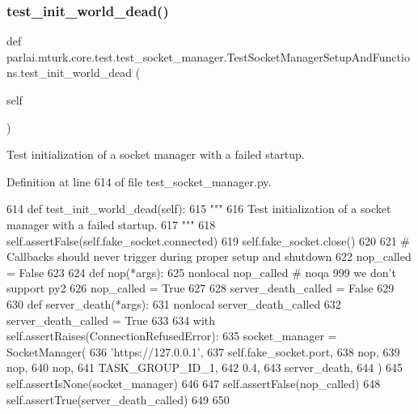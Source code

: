 \subsubsection{\texorpdfstring{test\+\_\+init\+\_\+world\+\_\+dead()}{test\_init\_world\_dead()}}
{\footnotesize\ttfamily def parlai.\+mturk.\+core.\+test.\+test\+\_\+socket\+\_\+manager.\+Test\+Socket\+Manager\+Setup\+And\+Functions.\+test\+\_\+init\+\_\+world\+\_\+dead (\begin{DoxyParamCaption}\item[{}]{self }\end{DoxyParamCaption})}

\begin{DoxyVerb}Test initialization of a socket manager with a failed startup.
\end{DoxyVerb}
 

Definition at line 614 of file test\+\_\+socket\+\_\+manager.\+py.


\begin{DoxyCode}
614     \textcolor{keyword}{def }test\_init\_world\_dead(self):
615         \textcolor{stringliteral}{"""}
616 \textcolor{stringliteral}{        Test initialization of a socket manager with a failed startup.}
617 \textcolor{stringliteral}{        """}
618         self.assertFalse(self.fake\_socket.connected)
619         self.fake\_socket.close()
620 
621         \textcolor{comment}{# Callbacks should never trigger during proper setup and shutdown}
622         nop\_called = \textcolor{keyword}{False}
623 
624         \textcolor{keyword}{def }nop(*args):
625             nonlocal nop\_called  \textcolor{comment}{# noqa 999 we don't support py2}
626             nop\_called = \textcolor{keyword}{True}
627 
628         server\_death\_called = \textcolor{keyword}{False}
629 
630         \textcolor{keyword}{def }server\_death(*args):
631             nonlocal server\_death\_called
632             server\_death\_called = \textcolor{keyword}{True}
633 
634         with self.assertRaises(ConnectionRefusedError):
635             socket\_manager = SocketManager(
636                 \textcolor{stringliteral}{'https://127.0.0.1'},
637                 self.fake\_socket.port,
638                 nop,
639                 nop,
640                 nop,
641                 TASK\_GROUP\_ID\_1,
642                 0.4,
643                 server\_death,
644             )
645             self.assertIsNone(socket\_manager)
646 
647         self.assertFalse(nop\_called)
648         self.assertTrue(server\_death\_called)
649 
650 
\end{DoxyCode}


